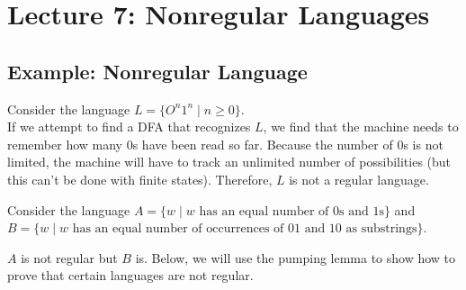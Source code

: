 \documentclass[11pt,a4paper]{article}
\begin{document}



\section{Lecture 7: Nonregular Languages}
\subsection{Example: Nonregular Language}
\begin{example}
    Consider the language $L=\{O^n1^n\mid n\geq 0\}$. \\

    If we attempt to find a DFA that recognizes $L$, we find that the machine needs to remember how many 0s have been read so far.
    Because the number of 0s is not limited, the machine will have to track an unlimited number of possibilities (but this can't be done with finite states).
    Therefore, $L$ is not a regular language.
\end{example}

\begin{example}
    Consider the language $A=\{w\mid w\text{ has an equal number of 0s and 1s}\}$ and $B=\{w\mid w\text{ has an equal number of occurrences of 01 and 10 as substrings}\}$.

    $A$ is not regular but $B$ is. Below, we will use the pumping lemma to show how to prove that certain languages are not regular.
\end{example}
\end{document}
